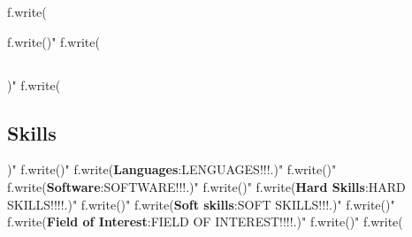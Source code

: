 f.write(\documentclass[a4paper, 9pt]{article})"
\begin{document}
 f.write()"
 f.write(\subsection*{})"
 f.write(\subsection*{Skills})"
 f.write()"
 f.write(\textbf {Languages}:\small LENGUAGES!!!.)"
 f.write()"
 f.write(\noindent \textbf{Software}:\small SOFTWARE!!!.)"
 f.write()"
 f.write(\noindent \textbf{Hard Skills}:\small HARD SKILLS!!!!.)"
 f.write()"
 f.write(\noindent \textbf{Soft skills}:\small SOFT SKILLS!!!.)"
 f.write()"
 f.write(\noindent \textbf{Field of Interest}:\small FIELD OF INTEREST!!!!.)"
 f.write()"
 f.write(
\end{document}
